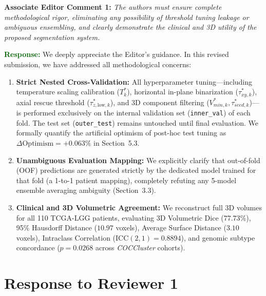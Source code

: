 \documentclass[11pt]{article}
\newcommand{\commentbox}[2]{%
\vspace{0.42em}\noindent
\textbf{\textcolor{NavyBlue}{#1:}} \textit{#2}\vspace{0.18em}%
}
\newcommand{\responsebox}[1]{%
\noindent
\textbf{\textcolor{DarkGreen}{Response:}} #1\vspace{0.42em}%
}
\begin{document}
\commentbox{Associate Editor Comment 1}{The authors must ensure complete methodological rigor, eliminating any possibility of threshold tuning leakage or ambiguous ensembling, and clearly demonstrate the clinical and 3D utility of the proposed segmentation system.}
\responsebox{We deeply appreciate the Editor's guidance. In this revised submission, we have addressed all methodological concerns:
\begin{enumerate}
    \item \textbf{Strict Nested Cross-Validation:} All hyperparameter tuning---including temperature scaling calibration ($T_k^*$), horizontal in-plane binarization ($\tau_{xy, k}^*$), axial rescue threshold ($\tau_{z,\mathrm{low}, k}^*$), and 3D component filtering ($V_{min, k}^*, \tau_{seed, k}^*$)---is performed exclusively on the internal validation set (\texttt{inner\_val}) of each fold. The test set (\texttt{outer\_test}) remains untouched until final evaluation. We formally quantify the artificial optimism of post-hoc test tuning as $\Delta\text{Optimism} = +0.063\%$ in Section~5.3.
    \item \textbf{Unambiguous Evaluation Mapping:} We explicitly clarify that out-of-fold (OOF) predictions are generated strictly by the dedicated model trained for that fold (a 1-to-1 patient mapping), completely refuting any 5-model ensemble averaging ambiguity (Section~3.3).
    \item \textbf{Clinical and 3D Volumetric Agreement:} We reconstruct full 3D volumes for all 110 TCGA-LGG patients, evaluating 3D Volumetric Dice ($77.73\%$), 95\% Hausdorff Distance ($10.97$ voxels), Average Surface Distance ($3.10$ voxels), Intraclass Correlation ($\text{ICC}(2, 1) = 0.8894$), and genomic subtype concordance ($p = 0.0268$ across \textit{COCCluster} cohorts).
\end{enumerate}
}

\section*{Response to Reviewer 1}
\end{document}
